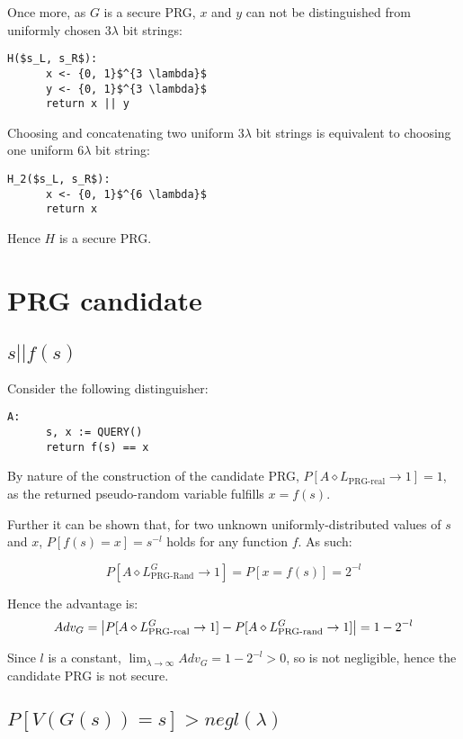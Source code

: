 \documentclass[a4paper]{scrreprt}
\DeclarePairedDelimiter\abs{\lvert}{\rvert}
\begin{document}
Once more, as $G$ is a secure PRG, $x$ and $y$ can not be distinguished from
uniformly chosen $3 \lambda$ bit strings:

\begin{lstlisting}[mathescape=true, frame=single]
	H($s_L, s_R$):
	  x <- {0, 1}$^{3 \lambda}$
	  y <- {0, 1}$^{3 \lambda}$
	  return x || y
\end{lstlisting}

Choosing and concatenating two uniform $3 \lambda$ bit strings is equivalent to
choosing one uniform $6 \lambda$ bit string:

\begin{lstlisting}[mathescape=true, frame=single]
	H_2($s_L, s_R$):
	  x <- {0, 1}$^{6 \lambda}$
	  return x
\end{lstlisting}

Hence $H$ is a secure PRG.

\section{PRG candidate}

\subsection{$s || f(s)$}

Consider the following distinguisher:

\begin{lstlisting}[mathescape=true, frame=single]
	A:
	  s, x := QUERY()
	  return f(s) == x
\end{lstlisting}

By nature of the construction of the candidate PRG, $P[A \diamond
L_{\text{PRG-real}} \rightarrow 1] = 1$, as the returned pseudo-random variable
fulfills $x = f(s)$.

Further it can be shown that, for two unknown uniformly-distributed values of
$s$ and $x$, $P[f(s) = x] = s^{-l}$ holds for any function $f$. As such:

\[
	P[A \diamond L^G_{\text{PRG-Rand}} \rightarrow 1] = P[x = f(s)] = 2^{-l}
\]

Hence the advantage is:
\[
	Adv_G = \abs*{P[A \diamond L^G_{\text{PRG-real}} \rightarrow 1] - P[A \diamond L^G_{\text{PRG-rand}} \rightarrow 1]} = 1 - 2^{-l}
\]

Since $l$ is a constant, $\lim_{\lambda \rightarrow \infty} Adv_G = 1 - 2^{-l}
> 0$, so is not negligible, hence the candidate PRG is not secure.

\subsection{$P[V(G(s)) = s] > negl(\lambda)$}
\end{document}
